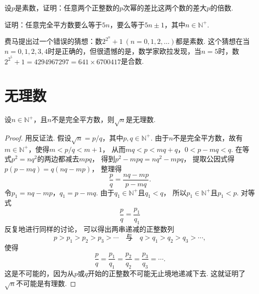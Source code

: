 \begin{example}
设\(p\)是素数，证明：任意两个正整数的\(p\)次幂的差比这两个数的差大\(p\)的倍数.
\end{example}

\begin{example}
证明：任意完全平方数要么等于\(5n\)，要么等于\(5n\pm1\)，其中\(n\in\mathbb{N}^+\).
\end{example}

\begin{example}[费马猜想]
费马提出过一个错误的猜想：数\(2^{2^n}+1\ (n=0,1,2,\dotsc)\)都是素数.
这个猜想在当\(n=0,1,2,3,4\)时是正确的，但很遗憾的是，数学家欧拉发现，当\(n=5\)时，数\(2^{2^5}+1 = 4294967297 = 641 \times 6700417\)是合数.
\end{example}

\section{无理数}
\begin{proposition}
设\(n\in\mathbb{N}^+\)，且\(n\)不是完全平方数，则\(\sqrt{n}\)是无理数.
\begin{proof}
用反证法.
假设\(\sqrt{n} = p/q\)，其中\(p,q\in\mathbb{N}^+\).
由于\(n\)不是完全平方数，故有\(m\in\mathbb{N}^+\)，使得\(m<p/q<m+1\)，
从而\(mq<p<mq+q\)，\(0<p-mq<q\).
在等式\(p^2=nq^2\)的两边都减去\(mpq\)，
得到\(p^2-mpq=nq^2-mpq\)，
提取公因式得\(p(p-mq)=q(nq-mp)\)，
整理得\begin{equation*}
	\frac{p}{q} = \frac{nq-mp}{p-mq}.
\end{equation*}
令\(p_1=nq-mp\)，\(q_1=p-mq\).
由于\(q_1\in\mathbb{N}^+\)且\(q_1<q\)，
所以\(p_1\in\mathbb{N}^+\)且\(p_1<p\).
对等式\begin{equation*}
	\frac{p}{q} = \frac{p_1}{q_1}
\end{equation*}反复地进行同样的讨论，
可以得出两串递减的正整数列\begin{equation*}
	p>p_1>p_2>p_3>\dotsb
	\quad\text{与}\quad
	q>q_1>q_2>q_3>\dotsb,
\end{equation*}
使得\begin{equation*}
	\frac{p}{q}=\frac{p_1}{q_1}=\frac{p_2}{q_2}=\frac{p_3}{q_3}=\dotsb.
\end{equation*}
这是不可能的，因为从\(p\)或\(q\)开始的正整数不可能无止境地递减下去.
这就证明了\(\sqrt{n}\)不可能是有理数.
\end{proof}
\end{proposition}
\endgroup
